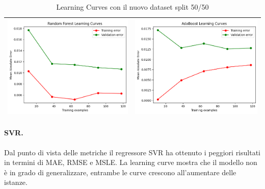 \begin{table}[H]
\begin{tabularx}{\textwidth}{|X|X|}
        \includegraphics[width=\linewidth, trim=0 0 0 0]{images/RandomForest_lc50.png} &
        \includegraphics[width=\linewidth, trim=0 0 0 0]{images/AdaBoost_lc50.png} \\
        \hline
    \end{tabularx}
    \caption{Learning Curves con il nuovo dataset split 50/50}
    \label{tab:emissions_info}
\end{table}

\paragraph{\textbf{SVR}.}
Dal punto di vista delle metriche il regressore SVR ha ottenuto i peggiori risultati in termini di MAE, RMSE e MSLE. La learning curve mostra che il modello non è in grado di generalizzare, entrambe le curve crescono all'aumentare delle istanze.

